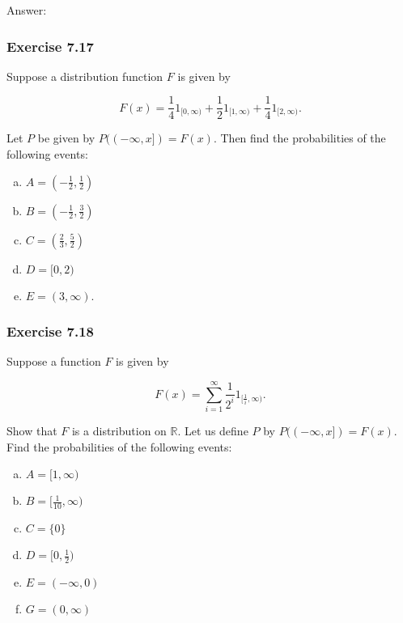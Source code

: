 \documentclass{article}
\begin{document}
{Answer:

\subsubsection*{Exercise 7.17}

Suppose a distribution function $F$ is given by

$$
F(x) = \frac{1}{4} 1_{[0,\infty)} + \frac{1}{2}1_{[1,\infty)} + \frac{1}{4}1_{[2,\infty)}.
$$

Let $P$ be given by $P((-\infty, x]) = F(x)$. Then find the probabilities of the following events:

\begin{enumerate}[a)]
\item $A = (-\frac{1}{2}, \frac{1}{2})$

\item $B = (-\frac{1}{2}, \frac{3}{2})$

\item $C = (\frac{2}{3}, \frac{5}{2})$

\item $D = [0,2)$

\item $E = (3,\infty)$. 
\end{enumerate}

\subsubsection*{Exercise 7.18}

Suppose a function $F$ is given by

$$
F(x) = \sum_{i=1}^\infty \frac{1}{2^i}1_{[\frac{1}{i}, \infty)} .
$$

Show that $F$ is a distribution on $\mathbb{R}$. Let us define $P$ by $P((-\infty, x]) = F(x)$. Find the probabilities of the following events:

\begin{enumerate}[a)]
\item $A = [1,\infty)$

\item $B = [\frac{1}{10}, \infty)$

\item $C = \{0\}$

\item $D = [0, \frac{1}{2})$ 

\item $E = (-\infty , 0)$

\item $G = (0,\infty)$
\end{enumerate}

}
\end{document}
